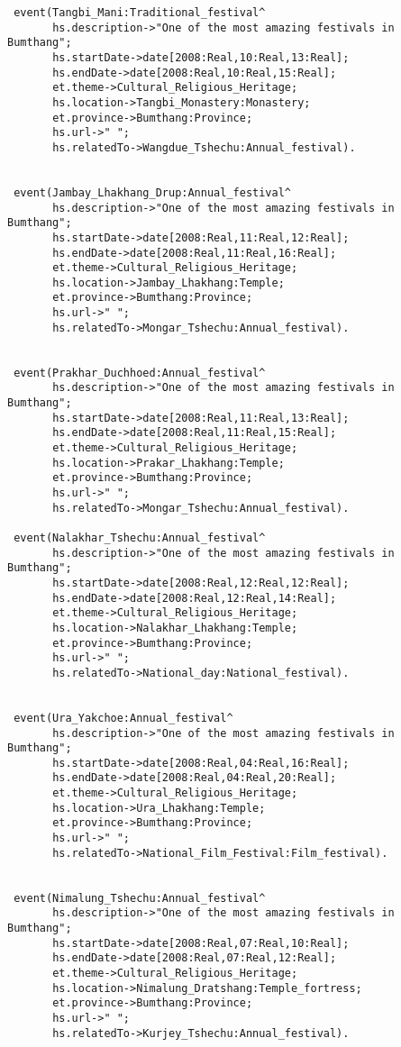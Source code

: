 \begin{verbatim}
 event(Tangbi_Mani:Traditional_festival^
       hs.description->"One of the most amazing festivals in Bumthang";
       hs.startDate->date[2008:Real,10:Real,13:Real];
       hs.endDate->date[2008:Real,10:Real,15:Real];
       et.theme->Cultural_Religious_Heritage;
       hs.location->Tangbi_Monastery:Monastery;
       et.province->Bumthang:Province;
       hs.url->" ";
       hs.relatedTo->Wangdue_Tshechu:Annual_festival).


 event(Jambay_Lhakhang_Drup:Annual_festival^
       hs.description->"One of the most amazing festivals in Bumthang";
       hs.startDate->date[2008:Real,11:Real,12:Real];
       hs.endDate->date[2008:Real,11:Real,16:Real];
       et.theme->Cultural_Religious_Heritage;
       hs.location->Jambay_Lhakhang:Temple;
       et.province->Bumthang:Province;
       hs.url->" ";
       hs.relatedTo->Mongar_Tshechu:Annual_festival).


 event(Prakhar_Duchhoed:Annual_festival^
       hs.description->"One of the most amazing festivals in Bumthang";
       hs.startDate->date[2008:Real,11:Real,13:Real];
       hs.endDate->date[2008:Real,11:Real,15:Real];
       et.theme->Cultural_Religious_Heritage;
       hs.location->Prakar_Lhakhang:Temple;
       et.province->Bumthang:Province;
       hs.url->" ";
       hs.relatedTo->Mongar_Tshechu:Annual_festival).

 event(Nalakhar_Tshechu:Annual_festival^
       hs.description->"One of the most amazing festivals in Bumthang";
       hs.startDate->date[2008:Real,12:Real,12:Real];
       hs.endDate->date[2008:Real,12:Real,14:Real];
       et.theme->Cultural_Religious_Heritage;
       hs.location->Nalakhar_Lhakhang:Temple;
       et.province->Bumthang:Province;
       hs.url->" ";
       hs.relatedTo->National_day:National_festival).


 event(Ura_Yakchoe:Annual_festival^
       hs.description->"One of the most amazing festivals in Bumthang";
       hs.startDate->date[2008:Real,04:Real,16:Real];
       hs.endDate->date[2008:Real,04:Real,20:Real];
       et.theme->Cultural_Religious_Heritage;
       hs.location->Ura_Lhakhang:Temple;
       et.province->Bumthang:Province;
       hs.url->" ";
       hs.relatedTo->National_Film_Festival:Film_festival).

   
 event(Nimalung_Tshechu:Annual_festival^
       hs.description->"One of the most amazing festivals in Bumthang";
       hs.startDate->date[2008:Real,07:Real,10:Real];
       hs.endDate->date[2008:Real,07:Real,12:Real];
       et.theme->Cultural_Religious_Heritage;
       hs.location->Nimalung_Dratshang:Temple_fortress;
       et.province->Bumthang:Province;
       hs.url->" ";
       hs.relatedTo->Kurjey_Tshechu:Annual_festival).
     

\end{verbatim}
